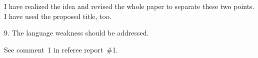 \documentclass{article}
\begin{document}
I have realized the idea and revised the whole paper to separate these two points.
I have used the proposed title, too.

\begin{leftbar} 
\end{leftbar}

\begin{quoting}
9. The language weakness should be addressed.
\end{quoting}

See comment~1 in referee report~\#1.




\end{document}
